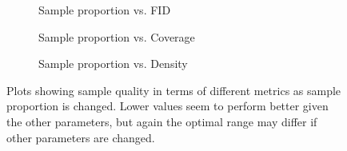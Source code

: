\begin{figure}
    \begin{subfigure}[b]{0.33\textwidth}
        \centering
        \resizebox{\textwidth}{!}{
            
        }
        \caption{Sample proportion vs. FID}
    \end{subfigure}
    \hfill
    \begin{subfigure}[b]{0.33\textwidth}
        \centering
        \resizebox{\textwidth}{!}{
            
        }
        \caption{Sample proportion vs. Coverage}
    \end{subfigure}
    \hfill
    \begin{subfigure}[b]{0.33\textwidth}
        \centering
        \resizebox{\textwidth}{!}{
            
        }
        \caption{Sample proportion vs. Density}
    \end{subfigure}
    \caption{
        Plots showing sample quality in terms of different metrics as sample
        proportion is changed. Lower values seem to perform better given the
        other parameters, but again the optimal range may differ if other
        parameters are changed.
    }
    \label{fig:prop}
\end{figure}

